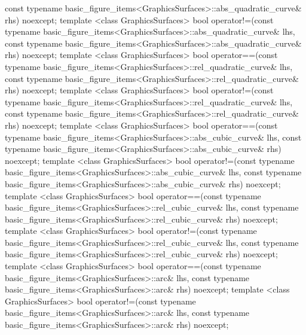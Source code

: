 \begin{codeblock}
{    const typename basic_figure_items<GraphicsSurfaces>::abs_quadratic_curve& rhs) noexcept;
  template <class GraphicsSurfaces>
  bool operator!=(const typename basic_figure_items<GraphicsSurfaces>::abs_quadratic_curve& lhs,
    const typename basic_figure_items<GraphicsSurfaces>::abs_quadratic_curve& rhs) noexcept;
  template <class GraphicsSurfaces>
  bool operator==(const typename basic_figure_items<GraphicsSurfaces>::rel_quadratic_curve& lhs,
    const typename basic_figure_items<GraphicsSurfaces>::rel_quadratic_curve& rhs) noexcept;
  template <class GraphicsSurfaces>
  bool operator!=(const typename basic_figure_items<GraphicsSurfaces>::rel_quadratic_curve& lhs,
    const typename basic_figure_items<GraphicsSurfaces>::rel_quadratic_curve& rhs) noexcept;
  template <class GraphicsSurfaces>
  bool operator==(const typename basic_figure_items<GraphicsSurfaces>::abs_cubic_curve& lhs,
    const typename basic_figure_items<GraphicsSurfaces>::abs_cubic_curve& rhs) noexcept;
  template <class GraphicsSurfaces>
  bool operator!=(const typename basic_figure_items<GraphicsSurfaces>::abs_cubic_curve& lhs,
    const typename basic_figure_items<GraphicsSurfaces>::abs_cubic_curve& rhs) noexcept;
  template <class GraphicsSurfaces>
  bool operator==(const typename basic_figure_items<GraphicsSurfaces>::rel_cubic_curve& lhs,
    const typename basic_figure_items<GraphicsSurfaces>::rel_cubic_curve& rhs) noexcept;
  template <class GraphicsSurfaces>
  bool operator!=(const typename basic_figure_items<GraphicsSurfaces>::rel_cubic_curve& lhs,
    const typename basic_figure_items<GraphicsSurfaces>::rel_cubic_curve& rhs) noexcept;
  template <class GraphicsSurfaces>
  bool operator==(const typename basic_figure_items<GraphicsSurfaces>::arc& lhs,
    const typename basic_figure_items<GraphicsSurfaces>::arc& rhs) noexcept;
  template <class GraphicsSurfaces>
  bool operator!=(const typename basic_figure_items<GraphicsSurfaces>::arc& lhs,
    const typename basic_figure_items<GraphicsSurfaces>::arc& rhs) noexcept;
}
\end{codeblock}